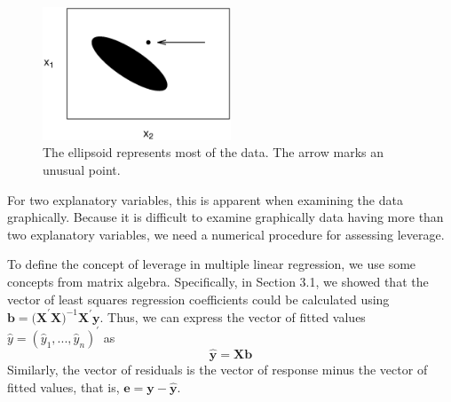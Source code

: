 \begin{figure}[htp]
  \begin{center}
    \includegraphics[width=0.5\textwidth]{Chapter5/F5Ellipsoid.eps}
    \caption{\label{F5:Ellipsoid} \small  The ellipsoid
represents most of the data. The arrow marks an unusual point.}
  \end{center}
\end{figure}


For two explanatory variables, this is apparent when examining the
data graphically. Because it is difficult to examine graphically
data having more than two explanatory variables, we need a numerical
procedure for assessing leverage.


To define the concept of leverage in multiple linear regression, we
use some concepts from matrix algebra. Specifically, in Section 3.1,
we showed that the vector of least squares regression coefficients
could be calculated using
$\mathbf{b}=\mathbf{(X}^{\prime}\mathbf{X)}^{-1}\mathbf{X}^{\prime}\mathbf{y
}$. Thus, we can express the vector of fitted values
$\hat{y}=(\hat{y}_1,...,\hat{y}_n)^{\prime}$ as
\begin{equation}\label{E5:FittedValues}
\mathbf{\hat{y}}=\mathbf{Xb}
\end{equation}
Similarly, the vector of residuals is the vector of response minus
the vector of fitted values, that is,
$\mathbf{e}=\mathbf{y-\hat{y}}$.

